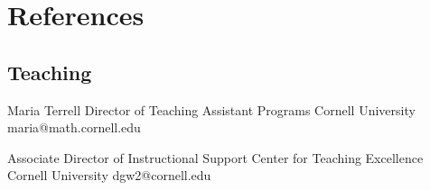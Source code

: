 \documentclass[10pt,a4paper,sans]{moderncv}
\newif\ifref
\begin{document}
\printbibliography[heading=subbibliography,title={Workshop Articles}, prefixnumbers={W}, keyword={workshop}]


% 
% 





\ifref
\newpage
\section{References}

\subsection{Teaching}

{Maria Terrell}
{Director of Teaching Assistant Programs}
{Cornell University}
{}
{maria@math.cornell.edu}


{Associate Director of Instructional Support}
{Center for Teaching Excellence}
{Cornell University}
{dgw2@cornell.edu}
\end{document}
